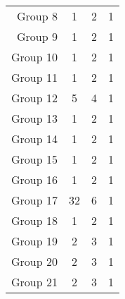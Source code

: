 \begin{table}[H]
\begin{tabular}{@{}rccc@{}}
        Group 8  & 1                                         & 2                                          & 1                                      \\
        Group 9  & 1                                         & 2                                          & 1                                      \\
        Group 10 & 1                                         & 2                                          & 1                                      \\
        Group 11 & 1                                         & 2                                          & 1                                      \\
        Group 12 & 5                                         & 4                                          & 1                                      \\
        Group 13 & 1                                         & 2                                          & 1                                      \\
        Group 14 & 1                                         & 2                                          & 1                                      \\
        Group 15 & 1                                         & 2                                          & 1                                      \\
        Group 16 & 1                                         & 2                                          & 1                                      \\
        Group 17 & 32                                        & 6                                          & 1                                      \\
        Group 18 & 1                                         & 2                                          & 1                                      \\
        Group 19 & 2                                         & 3                                          & 1                                      \\
        Group 20 & 2                                         & 3                                          & 1                                      \\
        Group 21 & 2                                         & 3                                          & 1                                      \\

\end{tabular}
\end{table}
